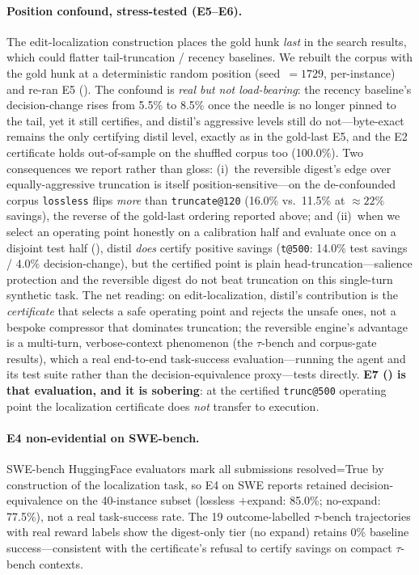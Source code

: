 \documentclass{article}
\makeatletter
\newcommand{\OrigRecencyDC}{5.5\%}   \newcommand{\OrigRecencySav}{16.1\%}
\newcommand{\ShufRecencyDC}{8.5\%}   \newcommand{\ShufRecencySav}{15.9\%}
\newcommand{\ShufLosslessDC}{16.0\%} \newcommand{\ShufLosslessSav}{21.7\%}
\newcommand{\ShufTruncShortDC}{11.5\%} \newcommand{\ShufTruncShortSav}{22.8\%}
\newcommand{\ShufCoverage}{100.0\%}
\newcommand{\SweepPoint}{\texttt{t@500}}
\newcommand{\SweepTestSav}{14.0\%}
\newcommand{\SweepTestDC}{4.0\%}
\makeatother
\begin{document}
\paragraph{Position confound, stress-tested (E5--E6).} The edit-localization
construction places the gold hunk \emph{last} in the search results, which could
flatter tail-truncation / recency baselines. We rebuilt the corpus with the gold
hunk at a deterministic random position (seed~$=1729$, per-instance) and re-ran E5
(). The confound is \emph{real but not load-bearing}: the recency
baseline's decision-change rises from \OrigRecencyDC{} to \ShufRecencyDC{} once the
needle is no longer pinned to the tail, yet it still certifies, and distil's
aggressive levels still do not---byte-exact remains the only certifying distil level,
exactly as in the gold-last E5, and the E2 certificate holds out-of-sample on the
shuffled corpus too (\ShufCoverage{}). Two consequences we report rather than gloss:
(i)~the reversible digest's edge over equally-aggressive truncation is itself
position-sensitive---on the de-confounded corpus \texttt{lossless} flips
\emph{more} than \texttt{truncate@120} (\ShufLosslessDC{} vs.\ \ShufTruncShortDC{} at
$\approx22\%$ savings), the reverse of the gold-last ordering reported above; and
(ii)~when we select an operating point honestly on a calibration half and evaluate
once on a disjoint test half (), distil \emph{does} certify positive
savings (\SweepPoint{}: \SweepTestSav{} test savings / \SweepTestDC{} decision-change),
but the certified point is plain head-truncation---salience protection and the
reversible digest do not beat truncation on this single-turn synthetic task. The
net reading: on edit-localization, distil's contribution is the \emph{certificate}
that selects a safe operating point and rejects the unsafe ones, not a bespoke
compressor that dominates truncation; the reversible engine's advantage is a
multi-turn, verbose-context phenomenon (the $\tau$-bench and corpus-gate results),
which a real end-to-end task-success evaluation---running the agent and its test
suite rather than the decision-equivalence proxy---tests directly. \textbf{E7
() is that evaluation, and it is sobering}: at the certified
\texttt{trunc@500} operating point the localization certificate does \emph{not}
transfer to execution.

\paragraph{E4 non-evidential on SWE-bench.} SWE-bench HuggingFace evaluators mark
all submissions resolved=True by construction of the localization task, so E4 on
SWE reports retained decision-equivalence on the 40-instance subset (lossless
$+$expand: 85.0\%; no-expand:
77.5\%), not a real task-success rate. The 19 outcome-labelled $\tau$-bench
trajectories with real reward labels show the digest-only tier (no expand) retains
0\% baseline success---consistent with the certificate's refusal to certify savings
on compact $\tau$-bench contexts.
\end{document}
